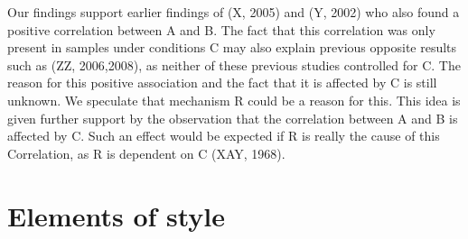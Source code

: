 \documentclass[justified, notoc]{tufte-book} %
\begin{document}
Our findings support earlier findings of (X, 2005) and (Y, 2002)
who also found a positive correlation between A and B. The fact
that this correlation was only present in samples under conditions
C may also explain previous opposite results such as (ZZ,
2006,2008), as neither of these previous studies controlled for C.
The reason for this positive association and the fact that it is
affected by C is still unknown. We speculate that mechanism R
could be a reason for this. This idea is given further support by
the observation that the correlation between A and B is affected
by C. Such an effect would be expected if R is really the cause of
this Correlation, as R is dependent on C (XAY, 1968).

\chapter{Elements of style}
\end{document}
